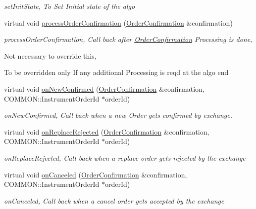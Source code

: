 \begin{DoxyCompactItemize}
\begin{DoxyCompactList}\small\item\em set\-Init\-State, To Set Initial state of the algo \end{DoxyCompactList}\item 
virtual void \hyperlink{class_a_p_i2_1_1_s_g_context_a7659de89afb69a32e1e2934d9d620429}{process\-Order\-Confirmation} (\hyperlink{class_a_p_i2_1_1_order_confirmation}{Order\-Confirmation} \&confirmation)
\begin{DoxyCompactList}\small\item\em process\-Order\-Confirmation, Call back after \hyperlink{class_a_p_i2_1_1_order_confirmation}{Order\-Confirmation} Processing is done, \par
 Not necessary to override this, \par
 To be overridden only If any additional Processing is reqd at the algo end \end{DoxyCompactList}\item 
virtual void \hyperlink{class_a_p_i2_1_1_s_g_context_a7aea075d2b1b88e18b0708a05ce0a60c}{on\-New\-Confirmed} (\hyperlink{class_a_p_i2_1_1_order_confirmation}{Order\-Confirmation} \&confirmation, C\-O\-M\-M\-O\-N\-::\-Instrument\-Order\-Id $\ast$order\-Id)
\begin{DoxyCompactList}\small\item\em on\-New\-Confirmed, Call back when a new Order gets confirmed by exchange. \end{DoxyCompactList}\item 
virtual void \hyperlink{class_a_p_i2_1_1_s_g_context_a3628f6c31070455a4b994e1b6e763ebe}{on\-Replace\-Rejected} (\hyperlink{class_a_p_i2_1_1_order_confirmation}{Order\-Confirmation} \&confirmation, C\-O\-M\-M\-O\-N\-::\-Instrument\-Order\-Id $\ast$order\-Id)
\begin{DoxyCompactList}\small\item\em on\-Replace\-Rejected, Call back when a replace order gets rejected by the exchange \end{DoxyCompactList}\item 
virtual void \hyperlink{class_a_p_i2_1_1_s_g_context_add684084c3684e8034cea65cb35b0b6f}{on\-Canceled} (\hyperlink{class_a_p_i2_1_1_order_confirmation}{Order\-Confirmation} \&confirmation, C\-O\-M\-M\-O\-N\-::\-Instrument\-Order\-Id $\ast$order\-Id)
\begin{DoxyCompactList}\small\item\em on\-Canceled, Call back when a cancel order gets accepted by the exchange \end{DoxyCompactList}\item 

\end{DoxyCompactItemize}
